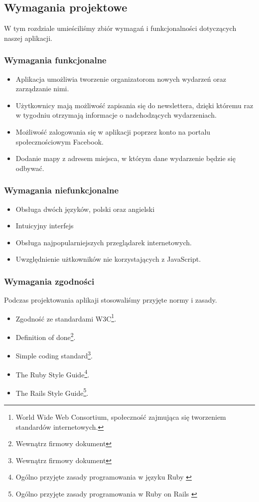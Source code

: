 

\subsection{Wymagania projektowe}
W tym rozdziale umieściliśmy zbiór wymagań i funkcjonalności dotyczących naszej aplikacji.
  \subsubsection{Wymagania funkcjonalne}
    \begin{itemize}
      \item Aplikacja umożliwia tworzenie organizatorom nowych wydarzeń oraz zarządzanie nimi.
      \item Użytkownicy mają możliwość zapisania się do newslettera, dzięki któremu raz w tygodniu otrzymają informacje o nadchodzących wydarzeniach.
      \item Możliwość zalogowania się w aplikacji poprzez konto na portalu społecznościowym Facebook.
      \item Dodanie mapy z adresem miejsca, w którym dane wydarzenie będzie się odbywać.
    \end{itemize}
  \subsubsection{Wymagania niefunkcjonalne}
    \begin{itemize}
      \item Obsługa dwóch języków, polski oraz angielski
      \item Intuicyjny interfejs
      \item Obsługa najpopularniejszych przeglądarek internetowych.
      \item Uwzględnienie użtkowników nie korzystających z JavaScript.
    \end{itemize}

  \subsubsection{Wymagania zgodności}
    Podczas projektowania aplikaji stosowaliśmy przyjęte normy i zasady.
    \begin{itemize}
      \item Zgodność ze standardami W3C\footnote{World Wide Web Consortium, społeczność zajmująca się tworzeniem standardów internetowych.}.
      \item Definition of done\footnote{Wewnątrz firmowy dokument\cite{dod}}.
      \item Simple coding standard\footnote{Wewnątrz firmowy dokument\cite{scs}}.
      \item The Ruby Style Guide\footnote{Ogólno przyjęte zasady programowania w języku Ruby \cite{ruby_style_guide}}.
      \item The Rails Style Guide\footnote{Ogólno przyjęte zasady programowania w Ruby on Rails \cite{rails_style_guide}}.
    \end{itemize}
